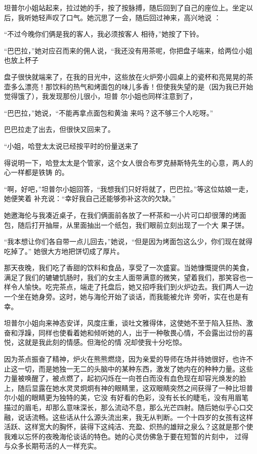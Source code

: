\documentclass{article}
\begin{document}
坦普尔小姐站起来，拉过她的手，按了按脉搏，随后回到了自己的座位上。坐定以后，我听她轻声叹了口气。她沉思了一会，随后回过神来，高兴地说
： 

“不过今晚你们俩是我的客人，我必须按客人
相待，”她按了下铃。 

“巴巴拉，”她对应召而来的佣人说，“我还没有用茶呢，你把盘子端来，给两位小姐也放上杯子

盘子很快就端来了，在我的目光中，这些放在火炉旁小园桌上的瓷杯和亮晃晃的茶壶多么漂亮！那饮料的热气和烤面包的味儿多香！但使我失望的是（因为我已开始觉得饿了），我发现那份儿很小，坦普
尔小姐也同样注意到了， 

“巴巴拉，”她说，“不能再拿点面包和黄油
来吗？这不够三个人吃呀。” 

\newpage


巴巴拉走了出去，但很快又回来了。 

“小姐，哈登太太说已经按平时的份量送来了

得说明一下，哈登太太是个管家，这个女人很合布罗克赫斯特先生的心意，两人的心一样都是铁铸
的。 

“啊，好吧，”坦普尔小姐回答，“我想我们只好将就了，巴巴拉。”等这位姑娘一走，她便笑着
补充说：“幸好我自己还能够弥补这次的欠缺。” 

她邀海伦与我凑近桌子，在我们俩面前各放了一杯茶和一小片可口却很薄的烤面包，随后打开抽屉，从里面抽出一个纸包，我们眼前立刻出现了一个大
果子饼。 

“我本想让你们各自带一点儿回去，”她说，“但是因为烤面包这么少，你们现在就得吃掉了。”
她很大方地把饼切成了厚片。 

\newpage

那天夜晚，我们吃了香甜的饮料和食品，享受了一次盛宴。当她慷慨提供的美食，满足了我们的辘辘饥肠时，我们的女主人面带满意的微笑，望着我们，那笑容也一样令人愉快。吃完茶点，端走了托盘后，她又招呼我们到火炉边去。我们两人一边一个坐在她身旁。这时，她与海伦开始了谈话，而我能被允许
旁听，实在也是有幸。 

坦普尔小姐向来神态安详，风度庄重，谈吐文雅得体，这使她不至于陷入狂热、激奋和浮躁，同样也使看着她和倾听她的人，出于一种敬畏心情，不会露出过份的喜悦，这就是我此刻的情感。但海伦的情
况却使我十分吃惊。 

因为茶点振奋了精神，炉火在熊熊燃烧，因为亲爱的导师在场并待她很好，也许不止这一切，而是她独一无二的头脑中的某种东西，激发了她内在的种种力量。这些力量被唤醒了，被点燃了，起初闪烁在一向苍白而没有血色现在却容光焕发的脸上，随后显露在她水灵灵炯炯有神的眼睛里，这双眼睛突然之间获得了一种比坦普尔小姐的眼睛更为独特的美，它没
\newpage
有好看的色彩，没有长长的睫毛，没有用眉笔描过的眉毛，却那么意味深长，那么流动不息，那么光芒四射。随后她似乎心口交融，说话流畅。这些话从什么源头流出来，我无从判断。一个十四岁的女孩有这样活跃、这样宽大的胸怀，装得下这纯洁、充盈、炽热的雄辩之泉么？这就是那个使我难以忘怀的夜晚海伦谈话的特色。她的心灵仿佛急于要在短暂的片刻中，
过得与众多长期苟活的人一样充实。 
\end{document}
